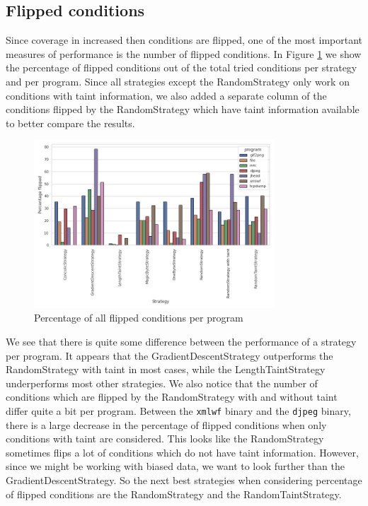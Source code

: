 \subsection{Flipped conditions}
Since coverage in increased then conditions are flipped, one of the most important measures of performance is the number of flipped conditions. In Figure \ref{fig:flipped-conditions} we show the percentage of flipped conditions out of the total tried conditions per strategy and per program. Since all strategies except the RandomStrategy only work on conditions with taint information, we also added a separate column of the conditions flipped by the RandomStrategy which have taint information available to better compare the results.

\begin{figure}[H]
    \centering
    \includegraphics[width=0.8\textwidth]{5_results/graphs_new/percentage_flipped_total.png}  
    \caption{Percentage of all flipped conditions per program}
    \label{fig:flipped-conditions}
\end{figure}

We see that there is quite some difference between the performance of a strategy per program. It appears that the GradientDescentStrategy outperforms the RandomStrategy with taint in most cases, while the LengthTaintStrategy underperforms most other strategies. We also notice that the number of conditions which are flipped by the RandomStrategy with and without taint differ quite a bit per program. Between the \texttt{xmlwf} binary and the \texttt{djpeg} binary, there is a large decrease in the percentage of flipped conditions when only conditions with taint are considered. This looks like the RandomStrategy sometimes flips a lot of conditions which do not have taint information.
However, since we might be working with biased data, we want to look further than the GradientDescentStrategy. So the next best strategies when considering percentage of flipped conditions are the RandomStrategy and the RandomTaintStrategy.

